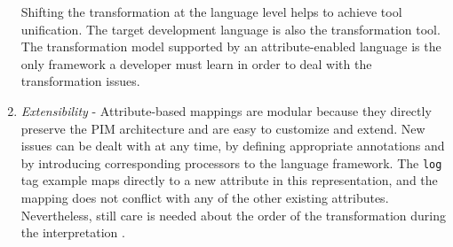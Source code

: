 \begin{enumerate}
Shifting the transformation at the language level helps to achieve tool unification. The target development language is also the transformation tool. The transformation model supported by an attribute-enabled language is the only framework a developer must learn in order to deal with the transformation issues.

\item \textit{Extensibility} - Attribute-based mappings are modular because they directly preserve the PIM architecture and are easy to customize and extend. New issues can be dealt with at any time, by defining appropriate annotations and by introducing corresponding processors to the language framework. The {\tt log} tag example maps directly to a new attribute in this representation, and the mapping does not conflict with any of the other existing attributes. Nevertheless, still care is needed about the order of the transformation during the interpretation .
\end{enumerate}

